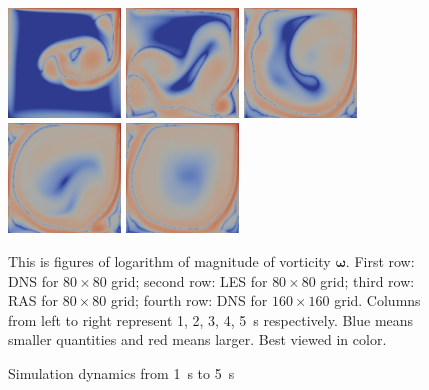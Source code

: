 \documentclass[english, nochinese]{pkupaper}
\begin{document}
\begin{figure}
{{
\includegraphics[width=3cm]{Results/Figure02p.pdf}
\includegraphics[width=3cm]{Results/Figure02q.pdf}
\includegraphics[width=3cm]{Results/Figure02r.pdf}
\includegraphics[width=3cm]{Results/Figure02s.pdf}
\includegraphics[width=3cm]{Results/Figure02t.pdf}
}
\caption{Simulation dynamics from \SI{1}{s} to \SI{5}{s}}
\label{Fig:Dy}
}
{
\footnotesize
This is figures of logarithm of magnitude of vorticity $\bm{\omega}$. First row: DNS for $ 80 \times 80 $ grid; second row: LES for $ 80 \times 80 $ grid; third row: RAS for $ 80 \times 80 $ grid; fourth row: DNS for $ 160 \times 160 $ grid. Columns from left to right represent 1, 2, 3, 4, \SI{5}{\second} respectively. Blue means smaller quantities and red means larger. Best viewed in color.
}
\end{figure}
\end{document}
